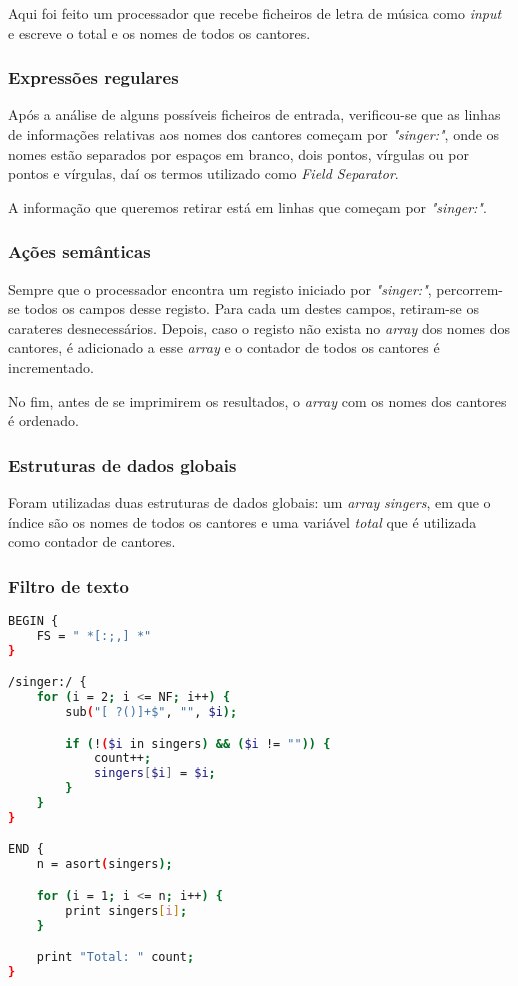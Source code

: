 \documentclass{article}
\begin{document}
Aqui foi feito um processador que recebe ficheiros de letra de música como \emph{input} e escreve o total e os nomes de todos os cantores.

\subsubsection{Expressões regulares}

Após a análise de alguns possíveis ficheiros de entrada, verificou-se que as linhas de informações relativas aos nomes dos cantores começam por \emph{"singer:"}, onde os nomes estão separados por espaços em branco, dois pontos, vírgulas ou por pontos e vírgulas, daí os termos utilizado como \emph{Field Separator}.

A informação que queremos retirar está em linhas que começam por \emph{"singer:"}.

\subsubsection{Ações semânticas}

Sempre que o processador encontra um registo iniciado por \emph{"singer:"}, percorrem-se todos os campos desse registo. Para cada um destes campos, retiram-se os carateres desnecessários. Depois, caso o registo não exista no \emph{array} dos nomes dos cantores, é adicionado a esse \emph{array} e o contador de todos os cantores é incrementado.

No fim, antes de se imprimirem os resultados, o \emph{array} com os nomes dos cantores é ordenado.

\subsubsection{Estruturas de dados globais}

Foram utilizadas duas estruturas de dados globais: um \emph{array} \emph{singers}, em que o índice são os nomes de todos os cantores e uma variável \emph{total} que é utilizada como contador de cantores.

\subsubsection{Filtro de texto}

\begin{lstlisting}[language=bash]
BEGIN {
	FS = " *[:;,] *"
}

/singer:/ {
	for (i = 2; i <= NF; i++) {
	    sub("[ ?()]+$", "", $i);

	    if (!($i in singers) && ($i != "")) {
	    	count++;
	    	singers[$i] = $i;
	    }
	}
}

END {
	n = asort(singers);

	for (i = 1; i <= n; i++) {
		print singers[i];
	}

	print "Total: " count;
}
\end{lstlisting}
\end{document}
